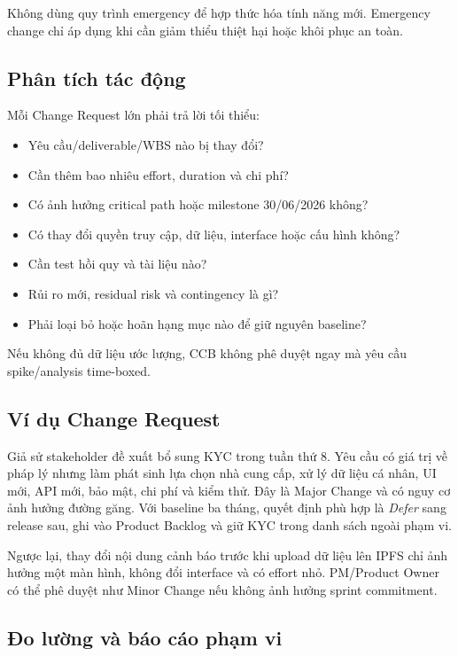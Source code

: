 Không dùng quy trình emergency để hợp thức hóa tính năng mới. Emergency change chỉ áp dụng khi cần giảm thiểu thiệt hại hoặc khôi phục an toàn.

\subsection{Phân tích tác động}

Mỗi Change Request lớn phải trả lời tối thiểu:

\begin{itemize}
  \item Yêu cầu/deliverable/WBS nào bị thay đổi?
  \item Cần thêm bao nhiêu effort, duration và chi phí?
  \item Có ảnh hưởng critical path hoặc milestone 30/06/2026 không?
  \item Có thay đổi quyền truy cập, dữ liệu, interface hoặc cấu hình không?
  \item Cần test hồi quy và tài liệu nào?
  \item Rủi ro mới, residual risk và contingency là gì?
  \item Phải loại bỏ hoặc hoãn hạng mục nào để giữ nguyên baseline?
\end{itemize}

Nếu không đủ dữ liệu ước lượng, CCB không phê duyệt ngay mà yêu cầu spike/analysis time-boxed.

\subsection{Ví dụ Change Request}

Giả sử stakeholder đề xuất bổ sung KYC trong tuần thứ 8. Yêu cầu có giá trị về pháp lý nhưng làm phát sinh lựa chọn nhà cung cấp, xử lý dữ liệu cá nhân, UI mới, API mới, bảo mật, chi phí và kiểm thử. Đây là Major Change và có nguy cơ ảnh hưởng đường găng. Với baseline ba tháng, quyết định phù hợp là \textit{Defer} sang release sau, ghi vào Product Backlog và giữ KYC trong danh sách ngoài phạm vi.

Ngược lại, thay đổi nội dung cảnh báo trước khi upload dữ liệu lên IPFS chỉ ảnh hưởng một màn hình, không đổi interface và có effort nhỏ. PM/Product Owner có thể phê duyệt như Minor Change nếu không ảnh hưởng sprint commitment.

\subsection{Đo lường và báo cáo phạm vi}

